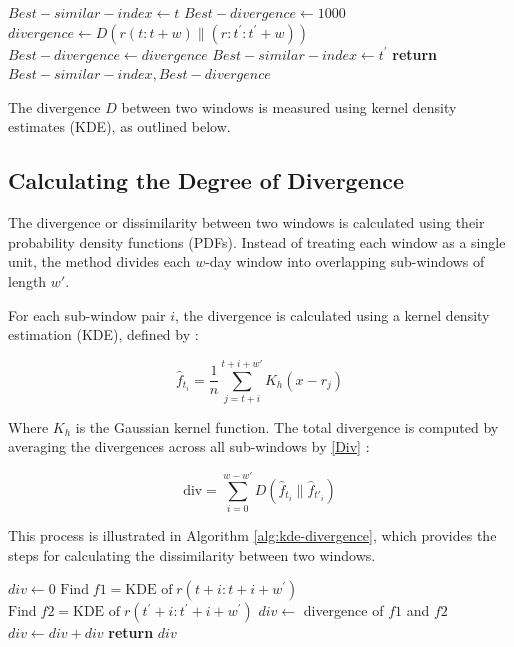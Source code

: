 \documentclass[preprint,12pt,authoryear]{elsarticle}
\begin{document}
\begin{algorithm}
\caption{Finding the best matching window in stock history based on similarity degree}\label{alg:best-match}
\begin{algorithmic}
\State $ Best-similar-index \gets t$
\State $Best-divergence \gets 1000$
\State $divergence \gets D(r(t:t+w)\parallel (r:t^{\prime}:t^{\prime}+w))$
\State $Best-divergence \gets divergence$
\State $Best-similar-index \gets t^{\prime}$
\EndIf
\EndFor
\State \textbf{return} $Best-similar-index, Best-divergence$
\end{algorithmic}
\end{algorithm}
The divergence \( D \) between two windows is measured using kernel density estimates (KDE), as outlined below.

\subsection{Calculating the Degree of Divergence}
\label{sec:Function}

The divergence or dissimilarity between two windows is calculated using their probability density functions (PDFs). Instead of treating each window as a single unit, the method divides each \( w \)-day window into overlapping sub-windows of length \( w' \). 

For each sub-window pair \( i \), the divergence is calculated using a kernel density estimation (KDE), defined by :

\begin{equation} \label{kernel}
    \hat{f}_{t_i} = \frac{1}{n} \sum_{j=t+i}^{t+i+w'} K_h(x - r_j)
\end{equation}

Where \( K_h \) is the Gaussian kernel function. The total divergence is computed by averaging the divergences across all sub-windows by \ref{Div} :

\begin{equation} \label{Div}
    \text{div} = \sum_{i=0}^{w-w'}D(\hat{f}_{t_i} \parallel \hat{f}_{t'_i})
\end{equation}

This process is illustrated in Algorithm  \ref{alg:kde-divergence}, which provides the steps for calculating the dissimilarity between two windows.

\begin{algorithm}
\caption{Pseudocode for calculating the dissimilarity between two windows relative to each other}
\label{alg:kde-divergence}
\begin{algorithmic}
\State $div \gets 0$
\State $\text{Find}\; f1 = \text{KDE of}\; r(t+i:t+i+w^{\prime})$
\State $\text{Find}\; f2 = \text{KDE of}\; r(t^{\prime}+i:t^{\prime}+i+w^{\prime})$
\State $div \gets$ divergence of $f1$ and $f2$
\State $div \gets div + div$
\EndFor
\State \textbf{return} $div$
\end{algorithmic}
\end{algorithm}
\end{document}
